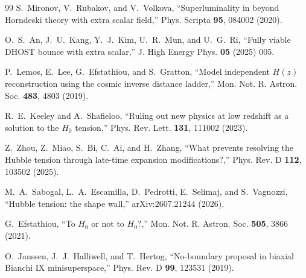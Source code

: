 \documentclass[11pt,letterpaper]{article}
\begin{document}
\begin{thebibliography}{99}
 S.~Mironov, V.~Rubakov, and V.~Volkova, ``Superluminality in beyond Horndeski theory with extra scalar field,'' Phys. Scripta \textbf{95}, 084002 (2020).

 O.~S.~An, J.~U.~Kang, Y.~J.~Kim, U.~R.~Mun, and U.~G.~Ri, ``Fully viable DHOST bounce with extra scalar,'' J. High Energy Phys. \textbf{05} (2025) 005.

 P.~Lemos, E.~Lee, G.~Efstathiou, and S.~Gratton, ``Model independent $H(z)$ reconstruction using the cosmic inverse distance ladder,'' Mon. Not. R. Astron. Soc. \textbf{483}, 4803 (2019).

 R.~E.~Keeley and A.~Shafieloo, ``Ruling out new physics at low redshift as a solution to the $H_0$ tension,'' Phys. Rev. Lett. \textbf{131}, 111002 (2023).

 Z.~Zhou, Z.~Miao, S.~Bi, C.~Ai, and H.~Zhang, ``What prevents resolving the Hubble tension through late-time expansion modifications?,'' Phys. Rev. D \textbf{112}, 103502 (2025).

 M.~A.~Sabogal, L.~A.~Escamilla, D.~Pedrotti, E.~Selimaj, and S.~Vagnozzi, ``Hubble tension: the shape wall,'' arXiv:2607.21244 (2026).

 G.~Efstathiou, ``To $H_0$ or not to $H_0$?,'' Mon. Not. R. Astron. Soc. \textbf{505}, 3866 (2021).

 O.~Janssen, J.~J.~Halliwell, and T.~Hertog, ``No-boundary proposal in biaxial Bianchi IX minisuperspace,'' Phys. Rev. D \textbf{99}, 123531 (2019).

\end{thebibliography}
\end{document}
